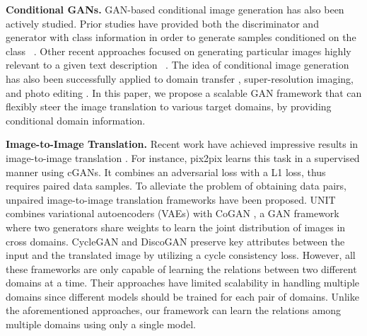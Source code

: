 \documentclass[10pt,twocolumn,letterpaper]{article}
\begin{document}
\medskip

\noindent\textbf{Conditional GANs.} GAN-based conditional image generation has also been actively studied. Prior studies have provided both the discriminator and generator with class information in order to generate samples conditioned on the class ~\cite{mirza2014conditional,odena2016semi,odena2016conditional}. Other recent approaches focused on generating particular images highly relevant to a given text description ~\cite{reed2016generative,zhang2016stackgan}. The idea of conditional image generation has also been successfully applied to domain transfer \cite{kim2017learning,taigman2016unsupervised}, super-resolution imaging\cite{Ledig_2017_CVPR}, and photo editing \cite{brock2016neural,Shu_2017_CVPR}.
In this paper, we propose a scalable GAN framework that can flexibly steer the image translation to various target domains, by providing conditional domain information. 

\medskip

\noindent \textbf{Image-to-Image Translation.} Recent work have achieved impressive results in image-to-image translation \cite{Isola_2017_CVPR, kim2017learning,liu2017unsupervised,zhu2017unpaired}. For instance, pix2pix \cite{Isola_2017_CVPR} learns this task in a supervised manner using cGANs\cite{mirza2014conditional}. It combines an adversarial loss with a L1 loss, thus requires paired data samples. To alleviate the problem of obtaining data pairs, unpaired image-to-image translation frameworks \cite{kim2017learning,liu2017unsupervised,zhu2017unpaired} have been proposed.
UNIT \cite{liu2017unsupervised} combines variational autoencoders (VAEs) \cite{kingma2013auto} with CoGAN \cite{liu2016coupled}, a GAN framework where two generators share weights to learn the joint distribution of images in cross domains. CycleGAN \cite{zhu2017unpaired} and DiscoGAN \cite{kim2017learning} preserve key attributes between the input and the translated image by utilizing a cycle consistency loss. However, all these frameworks are only capable of learning the relations between two different domains at a time. Their approaches have limited scalability in handling multiple domains since different models should be trained for each pair of domains. Unlike the aforementioned approaches, our framework can learn the relations among multiple domains using only a single model.

\end{document}
